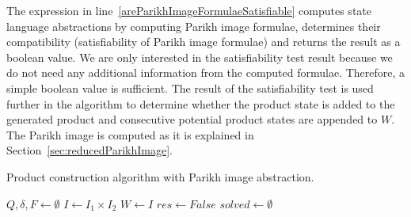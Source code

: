 The expression in line~\ref{areParikhImageFormulaeSatisfiable} computes state language abstractions by computing Parikh image formulae, determines their compatibility (satisfiability of Parikh image formulae) and returns the result as a boolean value. We are only interested in the satisfiability test result because we do not need any additional information from the computed formulae. Therefore, a simple boolean value is sufficient. The result of the satisfiability test is used further in the algorithm to determine whether the product state is added to the generated product and consecutive potential product states are appended to $W$. The Parikh image is computed as it is explained in Section~\ref{sec:reducedParikhImage}.

\begin{algorithm}
\caption{Product construction algorithm with Parikh image abstraction.}\label{productConstructionParikhImageAlgorithm}
\DontPrintSemicolon
{}
\BlankLine
$Q, \delta, F \gets \emptyset$ \;
$I \gets I_1 \times I_2$ \;
$W \gets I$ \;\label{work_set}
$res \gets False$ \;\label{sat}
$solved \gets \emptyset$ \;\label{PIAlgorithm:solved}
\end{algorithm}

